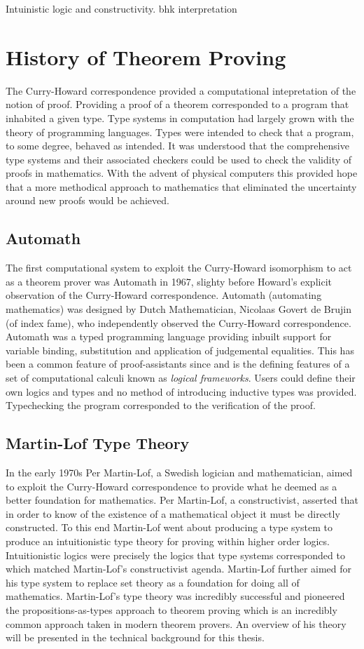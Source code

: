 Intuinistic logic and constructivity. bhk interpretation

\section{History of Theorem Proving}
The Curry-Howard correspondence provided a computational intepretation of the
notion of proof. Providing a proof of a theorem corresponded to a program that
inhabited a given type. Type systems in computation had largely grown with the
theory of programming languages. Types were intended to check that a program, to
some degree, behaved as intended. It was understood that the comprehensive type
systems and their associated checkers could be used to check the validity of
proofs in mathematics. With the advent of physical computers this provided hope
that a more methodical approach to mathematics that eliminated the uncertainty
around new proofs would be achieved.
\subsection{Automath}
The first computational system to exploit the Curry-Howard isomorphism to act as
a theorem prover was Automath in 1967, slighty before Howard's explicit
observation of the Curry-Howard correspondence. Automath (automating
mathematics) was designed by Dutch Mathematician, Nicolaas Govert de Brujin (of
index fame), who independently observed the Curry-Howard correspondence.
Automath was a typed programming language providing inbuilt support for variable
binding, substitution and application of judgemental equalities. This has been
a common feature of proof-assistants since and is the defining features of
a set of computational calculi known as \textit{logical frameworks}. Users could
define their own logics and types and no method of introducing inductive types
was provided. Typechecking the program corresponded to the verification of the
proof. 

\subsection{Martin-Lof Type Theory}
In the early 1970s Per Martin-Lof, a Swedish logician and mathematician, aimed
to exploit the Curry-Howard correspondence to provide what he deemed as a better
foundation for mathematics. Per Martin-Lof, a constructivist, asserted that in
order to know of the existence of a mathematical object it must be directly
constructed. To this end Martin-Lof went about producing a type system to
produce an intuitionistic type theory for proving within higher order logics.
Intuitionistic logics were precisely the logics that type systems corresponded
to which matched Martin-Lof's constructivist agenda. Martin-Lof further aimed
for his type system to replace set theory as a foundation for doing all of
mathematics. Martin-Lof's type theory was incredibly successful and pioneered
the propositions-as-types approach to theorem proving which is an incredibly
common approach taken in modern theorem provers. An overview of his theory will
be presented in the technical background for this thesis.


